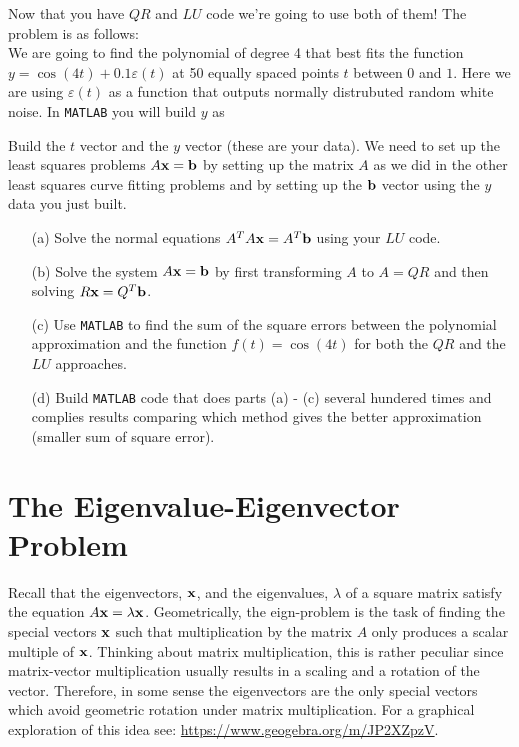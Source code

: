 \begin{problem}
    Now that you have $QR$ and $LU$ code we're going to use both of them!  The problem is
    as follows: \\
    We are going to find the polynomial of degree 4 that best fits the function $y =
    \cos(4t) + 0.1 \varepsilon(t)$ at 50 equally spaced points $t$ between $0$ and $1$.  Here
    we are using $\varepsilon(t)$ as a function that outputs normally distrubuted random
    white noise.  In \texttt{MATLAB} you will build $y$ as \\
    
    Build the $t$ vector
    and the $y$ vector (these are your data).  We need to set up the least squares
    problems $A {\bf x} = {\bf b}$ by setting up the matrix $A$
    as we did in the other least squares curve fitting problems and by setting up the
    ${\bf b}$ vector using the $y$ data you just built.  
    \begin{enumerate}
        \item[(a)] Solve the normal equations $A^T A {\bf x} = A^T {\bf b}$ using your $LU$ code.
        \item[(b)] Solve the system $A {\bf x} = {\bf b}$ by first transforming $A$ to $A = QR$
            and then solving $R{\bf x} = Q^T {\bf b}$.
        \item[(c)] Use \texttt{MATLAB} to find the sum of the square errors between the
            polynomial approximation and the function $f(t) = \cos(4t)$ for both the $QR$
            and the $LU$ approaches.  
        \item[(d)] Build \texttt{MATLAB} code that does parts (a) - (c) several hundered
            times and complies results comparing which method gives the better
            approximation (smaller sum of square error).
    \end{enumerate}
\end{problem}


\section{The Eigenvalue-Eigenvector Problem}
Recall that the eigenvectors, ${\bf x}$, and the eigenvalues, $\lambda$ of a square matrix satisfy the
equation $A{\bf x}=\lambda {\bf x}$. Geometrically, the eign-problem is the task of finding the special
vectors ${\bf x}$ such that multiplication by the matrix $A$ only produces a scalar multiple of
${\bf x}$. Thinking about matrix multiplication, this is rather peculiar since matrix-vector
multiplication usually results in a scaling and a rotation of the vector. Therefore, in
some sense the eigenvectors are the only special vectors which avoid geometric rotation
under matrix multiplication.  For a graphical exploration of this idea see:
\href{https://www.geogebra.org/m/JP2XZpzV}{https://www.geogebra.org/m/JP2XZpzV}.

